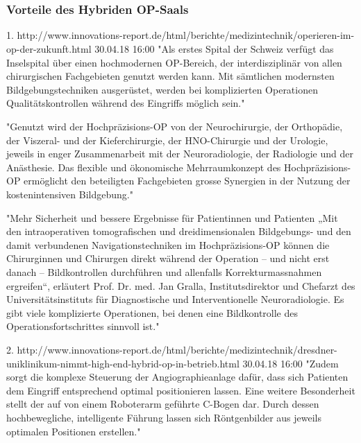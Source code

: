 \chapter{}
\label{sec:overview}

\subsection{Vorteile des Hybriden OP-Saals}
1. http://www.innovations-report.de/html/berichte/medizintechnik/operieren-im-op-der-zukunft.html 30.04.18 16:00
	"Als erstes Spital der Schweiz verfügt das Inselspital über einen hochmodernen OP-Bereich, der interdisziplinär von allen chirurgischen Fachgebieten genutzt werden kann. Mit sämtlichen modernsten Bildgebungstechniken ausgerüstet, werden bei komplizierten Operationen Qualitätskontrollen während des Eingriffs möglich sein."
	
	"Genutzt wird der Hochpräzisions-OP von der Neurochirurgie, der Orthopädie, der Viszeral- und der Kieferchirurgie, der HNO-Chirurgie und der Urologie, jeweils in enger Zusammenarbeit mit der Neuroradiologie, der Radiologie und der Anästhesie. Das flexible und ökonomische Mehrraumkonzept des Hochpräzisions-OP ermöglicht den beteiligten Fachgebieten grosse Synergien in der Nutzung der kostenintensiven Bildgebung."
	
	"Mehr Sicherheit und bessere Ergebnisse für Patientinnen und Patienten
	„Mit den intraoperativen tomografischen und dreidimensionalen Bildgebungs- und den damit verbundenen Navigationstechniken im Hochpräzisions-OP können die Chirurginnen und Chirurgen direkt während der Operation – und nicht erst danach – Bildkontrollen durchführen und allenfalls Korrekturmassnahmen ergreifen“, erläutert Prof. Dr. med. Jan Gralla, Institutsdirektor und Chefarzt des Universitätsinstituts für Diagnostische und Interventionelle Neuroradiologie. Es gibt viele komplizierte Operationen, bei denen eine Bildkontrolle des Operationsfortschrittes sinnvoll ist."

2. http://www.innovations-report.de/html/berichte/medizintechnik/dresdner-uniklinikum-nimmt-high-end-hybrid-op-in-betrieb.html 30.04.18 16:00	
	"Zudem sorgt die komplexe Steuerung der Angiographieanlage dafür, dass sich Patienten dem Eingriff entsprechend optimal positionieren lassen. Eine weitere Besonderheit stellt der auf von einem Roboterarm geführte C-Bogen dar. Durch dessen hochbewegliche, intelligente Führung lassen sich Röntgenbilder aus jeweils optimalen Positionen erstellen."
	

